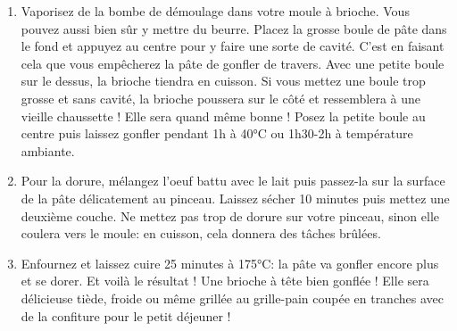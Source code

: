 {\begin{enumerate}
	\item Vaporisez de la bombe de démoulage dans votre moule à brioche. Vous pouvez aussi bien sûr y mettre du beurre. Placez la grosse boule de pâte dans le fond et appuyez au centre pour y faire une sorte de cavité. C'est en faisant cela que vous empêcherez la pâte de gonfler de travers. Avec une petite boule sur le dessus, la brioche tiendra en cuisson. Si vous mettez une boule trop grosse et sans cavité, la brioche poussera sur le côté et ressemblera à une vieille chaussette ! Elle sera quand même bonne ! Posez la petite boule au centre puis laissez gonfler pendant 1h à 40°C ou 1h30-2h à température ambiante. 
	\item  Pour la dorure, mélangez l'oeuf battu avec le lait puis passez-la sur la surface de la pâte délicatement au pinceau. Laissez sécher 10 minutes puis mettez une deuxième couche. Ne mettez pas trop de dorure sur votre pinceau, sinon elle coulera vers le moule: en cuisson, cela donnera des tâches brûlées. 
	\item  Enfournez et laissez cuire 25 minutes à 175°C: la pâte va gonfler encore plus et se dorer. Et voilà le résultat ! Une brioche à tête bien gonflée ! Elle sera délicieuse tiède, froide ou même grillée au grille-pain coupée en tranches avec de la confiture pour le petit déjeuner !
\end{enumerate}}

